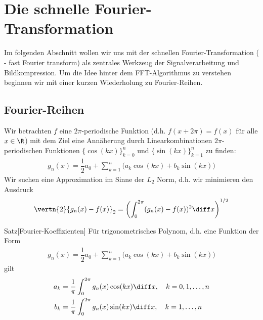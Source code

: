 
\section{Die schnelle Fourier-Transformation}

Im folgenden Abschnitt wollen wir uns mit der schnellen Fourier-Transformation ( - fast Fourier transform) 
als zentrales Werkzeug der Signalverarbeitung und Bildkompression. 
Um die Idee hinter dem FFT-Algorithmus zu verstehen beginnen wir mit einer kurzen Wiederholung zu Fourier-Reihen.

\subsection{Fourier-Reihen}
Wir betrachten $f$ eine $2\pi$-periodische Funktion (d.h. $f(x+2\pi)=f(x)$ für alle $x\in\R$) mit 
dem Ziel eine Annäherung durch Linearkombinationen $2\pi$-periodischen Funktionen $\{\cos(kx)\}_{k=0}^{n}$ und 
$\{\sin(kx)\}_{k=1}^{n}$ zu finden:
%
\begin{align*}
  g_n(x) = \dfrac{1}{2}a_0 + \sum_{k=1}^{n}\Big(a_k\cos(kx)+b_k\sin(kx)\Big)
\end{align*}
%
Wir suchen eine Approximation im Sinne der $L_2$ Norm, d.h. wir minimieren den Ausdruck
%
\begin{align*}
  \vertn{2}{g_n(x)-f(x)}_2 = \left(\int_{0}^{2\pi} (g_n(x)-f(x))^2 \diff x\right)^{1/2}
\end{align*}

\begin{colbox}{Satz}[Fourier-Koeffizienten]
  Für trigonometrisches Polynom, d.h. eine Funktion der Form  
  \begin{align*}
    g_n(x) = \dfrac{1}{2}a_0 + \sum_{k=1}^{n}\Big(a_k\cos(kx)+b_k\sin(kx)\Big)
  \end{align*}
  gilt 
  \begin{align*}
    a_k 
    &= \dfrac{1}{\pi} \int_{0}^{2\pi} g_n(x)\cos(kx) \diff x, \quad k=0,1,\dots,n \\
    b_k 
    &= \dfrac{1}{\pi} \int_{0}^{2\pi} g_n(x)\sin(kx) \diff x, \quad k=1,\dots,n 
  \end{align*}
\end{colbox}

